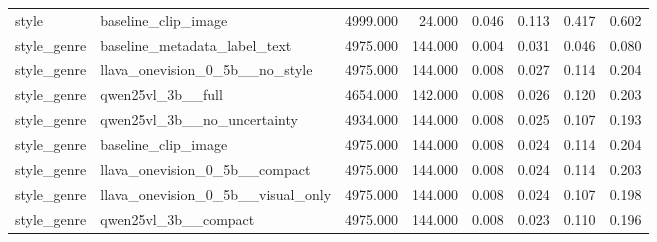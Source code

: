 \begin{tabular}{llrrrrrr}
style & baseline_clip_image & 4999.000 & 24.000 & 0.046 & 0.113 & 0.417 & 0.602 \\
style_genre & baseline_metadata_label_text & 4975.000 & 144.000 & 0.004 & 0.031 & 0.046 & 0.080 \\
style_genre & llava_onevision_0_5b__no_style & 4975.000 & 144.000 & 0.008 & 0.027 & 0.114 & 0.204 \\
style_genre & qwen25vl_3b__full & 4654.000 & 142.000 & 0.008 & 0.026 & 0.120 & 0.203 \\
style_genre & qwen25vl_3b__no_uncertainty & 4934.000 & 144.000 & 0.008 & 0.025 & 0.107 & 0.193 \\
style_genre & baseline_clip_image & 4975.000 & 144.000 & 0.008 & 0.024 & 0.114 & 0.204 \\
style_genre & llava_onevision_0_5b__compact & 4975.000 & 144.000 & 0.008 & 0.024 & 0.114 & 0.203 \\
style_genre & llava_onevision_0_5b__visual_only & 4975.000 & 144.000 & 0.008 & 0.024 & 0.107 & 0.198 \\
style_genre & qwen25vl_3b__compact & 4975.000 & 144.000 & 0.008 & 0.023 & 0.110 & 0.196 \\
\bottomrule
\end{tabular}
